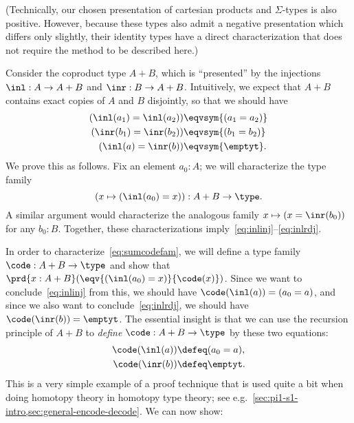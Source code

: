 (Technically, our chosen presentation of cartesian products and $\Sigma$-types is also positive.
However, because these types also admit a negative presentation which differs only slightly, their identity types have a direct characterization that does not require the method to be described here.)

Consider the coproduct type $A+B$, which is ``presented'' by the injections $\inl:A\to A+B$ and $\inr:B\to A+B$.
Intuitively, we expect that $A+B$ contains exact copies of $A$ and $B$ disjointly, so that we should have
\begin{align}
  {(\inl(a_1)=\inl(a_2))}&\eqvsym {(a_1=a_2)} \label{eq:inlinj}\\
  {(\inr(b_1)=\inr(b_2))}&\eqvsym {(b_1=b_2)}\\
  {(\inl(a)= \inr(b))} &\eqvsym {\emptyt}. \label{eq:inlrdj}
\end{align}
We prove this as follows.
Fix an element $a_0:A$; we will characterize the type family
\begin{equation}
  (x\mapsto (\inl(a_0)=x)) : A+B \to \type.\label{eq:sumcodefam}
\end{equation}
A similar argument would characterize the analogous family $x\mapsto (x = \inr(b_0))$ for any $b_0:B$.
Together, these characterizations imply~\eqref{eq:inlinj}--\eqref{eq:inlrdj}.

In order to characterize~\eqref{eq:sumcodefam}, we will define a type family $\code:A+B\to\type$ and show that $\prd{x:A+B} (\eqv{(\inl(a_0)=x)}{\code(x)})$.
Since we want to conclude~\eqref{eq:inlinj} from this, we should have $\code(\inl(a)) = (a_0=a)$, and since we also want to conclude~\eqref{eq:inlrdj}, we should have $\code (\inr(b)) = \emptyt$.
The essential insight is that we can use the recursion principle of $A+B$ to \emph{define} $\code:A+B\to\type$ by these two equations:
\begin{align*}
  \code(\inl(a)) &\defeq (a_0=a),\\
  \code(\inr(b)) &\defeq \emptyt.
\end{align*}
This is a very simple example of a proof technique that is used quite a
bit when doing homotopy theory in homotopy type theory; see
e.g.\ \cref{sec:pi1-s1-intro,sec:general-encode-decode}.
%
We can now show:

